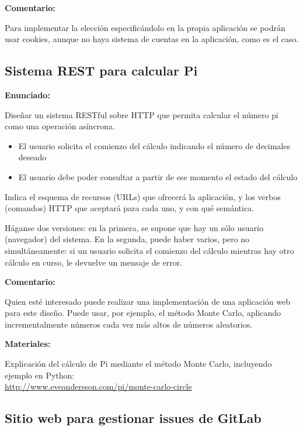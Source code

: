\textbf{Comentario:}

Para implementar la elección especificándolo en la propia aplicación se podrán usar cookies, aunque no haya sistema de cuentas en la aplicación, como es el caso.

\subsection{Sistema REST para calcular Pi}
\label{subsec:rest-pi}

\textbf{Enunciado:}

Diseñar un sistema RESTful sobre HTTP que permita calcular el número pi como una operación asíncrona.

\begin{itemize}
\item El usuario solicita el comienzo del cálculo indicando el número de decimales deseado
\item El usuario debe poder consultar a partir de ese momento el estado del cálculo
\end{itemize}

Indica el esquema de recursos (URLs) que ofrecerá la aplicación, y los verbos (comandos) HTTP que aceptará para cada uno, y con qué semántica.

Háganse dos versiones: en la primera, se supone que hay un sólo usuario (navegador) del sistema. En la segunda, puede haber varios, pero no simultáneamente: si un usuario solicita el comienzo del cálculo mientras hay otro cálculo en curso, le devuelve un mensaje de error.

\textbf{Comentario:}

Quien esté interesado puede realizar una implementación de una aplicación web para este diseño. Puede usar, por ejemplo, el método Monte Carlo, aplicando incrementalmente números cada vez más altos de números aleatorios.

\textbf{Materiales:}

Explicación del cálculo de Pi mediante el método Monte Carlo, incluyendo ejemplo en Python: \\
\url{http://www.eveandersson.com/pi/monte-carlo-circle}

\subsection{Sitio web para gestionar issues de GitLab}
\label{subsec:gitlab-issues}


